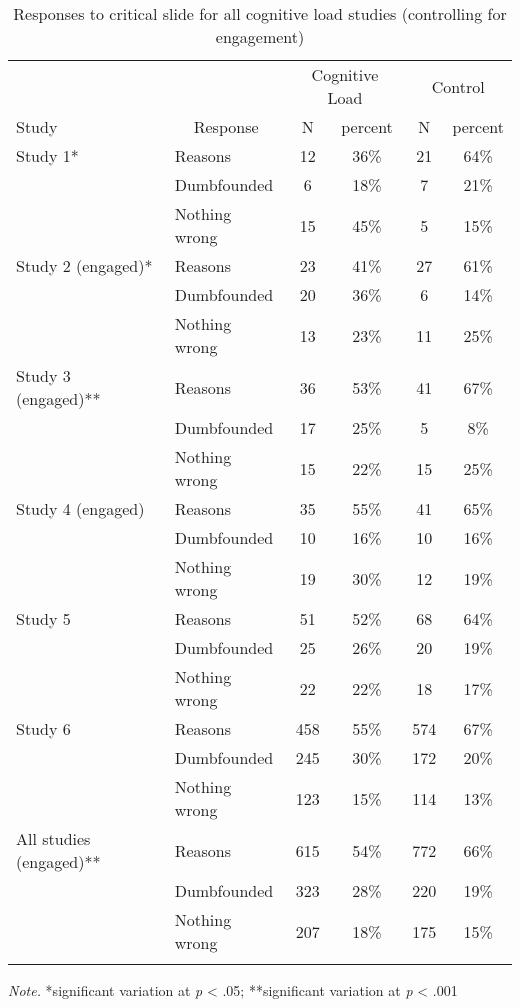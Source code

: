 \documentclass[
  american,
  man,floatsintext]{apa7}
\begin{document}
\begin{table}[tbp]

\begin{center}
\begin{threeparttable}

\caption{\label{tab:ch5taballeng}Responses to critical slide for all cognitive load studies (controlling for engagement)}

\small{

\begin{tabular}{llcccc}
\toprule
 &  & \multicolumn{2}{c}{Cognitive Load} & \multicolumn{2}{c}{Control} \\
\cmidrule(r){3-4} \cmidrule(r){5-6}
Study & \multicolumn{1}{c}{Response} & \multicolumn{1}{c}{N} & \multicolumn{1}{c}{percent} & \multicolumn{1}{c}{N} & \multicolumn{1}{c}{percent}\\
\midrule
Study 1* & Reasons & 12 & 36\% & 21 & 64\%\\
 & Dumbfounded & 6 & 18\% & 7 & 21\%\\
 & Nothing wrong & 15 & 45\% & 5 & 15\%\\
Study 2 (engaged)* & Reasons & 23 & 41\% & 27 & 61\%\\
 & Dumbfounded & 20 & 36\% & 6 & 14\%\\
 & Nothing wrong & 13 & 23\% & 11 & 25\%\\
Study 3 (engaged)** & Reasons & 36 & 53\% & 41 & 67\%\\
 & Dumbfounded & 17 & 25\% & 5 & 8\%\\
 & Nothing wrong & 15 & 22\% & 15 & 25\%\\
Study 4 (engaged) & Reasons & 35 & 55\% & 41 & 65\%\\
 & Dumbfounded & 10 & 16\% & 10 & 16\%\\
 & Nothing wrong & 19 & 30\% & 12 & 19\%\\
Study 5 & Reasons & 51 & 52\% & 68 & 64\%\\
 & Dumbfounded & 25 & 26\% & 20 & 19\%\\
 & Nothing wrong & 22 & 22\% & 18 & 17\%\\
Study 6 & Reasons & 458 & 55\% & 574 & 67\%\\
 & Dumbfounded & 245 & 30\% & 172 & 20\%\\
 & Nothing wrong & 123 & 15\% & 114 & 13\%\\
All studies (engaged)** & Reasons & 615 & 54\% & 772 & 66\%\\
 & Dumbfounded & 323 & 28\% & 220 & 19\%\\
 & Nothing wrong & 207 & 18\% & 175 & 15\%\\
\bottomrule
\addlinespace
\end{tabular}

}

\begin{tablenotes}[para]
\normalsize{\textit{Note.} *significant variation at \emph{p} < .05; **significant variation at \emph{p} < .001}
\end{tablenotes}

\end{threeparttable}
\end{center}

\end{table}


\clearpage
\renewcommand{\listfigurename}{Figure captions}

\clearpage
\renewcommand{\listtablename}{Table captions}
\end{document}
